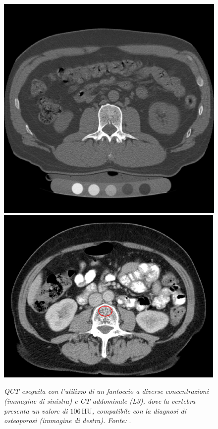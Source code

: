 \begin{figure}[htp]
\centering
\includegraphics[scale=0.6505]{Immagini/fantoccio.png}\quad\includegraphics[scale=0.9]{Immagini/osteoporosi.png}
\caption{\label{fig:fantoccio} \textit{QCT eseguita con l'utilizzo di un fantoccio a diverse concentrazioni (immagine di sinistra) e CT addominale (L3), dove la vertebra presenta un valore di $106\,\mathrm{HU}$, compatibile con la diagnosi di osteoporosi (immagine di destra). Fonte:} \cite{wiki:fantoccio, Murray2017}.}
\end{figure}

